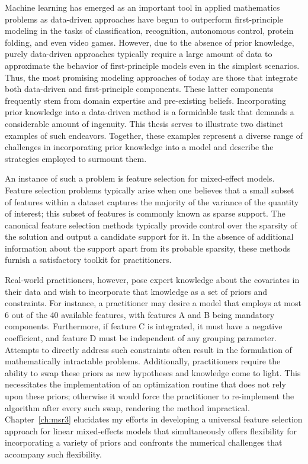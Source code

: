 
Machine learning has emerged as an important tool in applied mathematics problems as data-driven approaches have begun to outperform  first-principle modeling in the tasks of classification, recognition, autonomous control, protein folding, and even video games. However, due to the absence of prior knowledge,  purely data-driven approaches typically require a large amount of data to approximate the behavior of first-principle models even in the simplest scenarios. Thus, the most promising modeling approaches of today are those that integrate both data-driven and first-principle components. These latter components frequently stem from domain expertise and pre-existing beliefs. Incorporating prior knowledge into a data-driven method is a formidable task that demands a considerable amount of ingenuity. This thesis serves to illustrate two distinct examples of such endeavors.  Together, these examples represent a diverse range of challenges in incorporating prior knowledge into a model and describe the strategies employed to surmount them.

An instance of such a problem is feature selection for mixed-effect models. Feature selection problems typically arise when one believes that a small subset of features within a dataset captures the majority of the variance of the quantity of interest; this subset of features is commonly known as sparse support. The canonical feature selection methods typically provide control over the  sparsity of the solution and output a candidate support for it. In the absence of additional information about the support apart from its probable sparsity, these methods furnish a satisfactory toolkit for practitioners.

 Real-world practitioners, however, pose expert knowledge about the covariates in their data and wish to incorporate that knowledge as a set of priors and constraints. For instance, a practitioner may desire a model that employs at most 6 out of the 40 available features, with features A and B being mandatory components. Furthermore, if feature C is integrated, it must have a negative coefficient, and feature D must be independent of any grouping parameter. Attempts to directly address such constraints often result in the formulation of mathematically intractable problems. Additionally, practitioners require the ability to swap these priors as new hypotheses and knowledge come to light. This necessitates the implementation of an optimization routine that does not rely upon these priors; otherwise it would force the practitioner to re-implement the algorithm after every such swap, rendering the method impractical. Chapter~\ref{ch:msr3} elucidates my efforts in developing a universal feature selection approach for linear mixed-effects models that simultaneously offers flexibility for incorporating a variety of priors and confronts the numerical challenges that accompany such flexibility.


